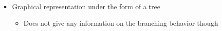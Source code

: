 \documentclass[professionalfont]{beamer}
\newcommand{\couleur}[1]{\textcolor{couleurimportante}{#1}}
\begin{document}
\begin{frame}
\begin{itemize}
	\bigskip

	\item Graphical representation under the form of a \couleur{tree}
	
	\begin{itemize}
		\item Does not give any information on the \couleur{branching behavior} though

% 
	\end{itemize}





\end{itemize}

\end{frame}
\end{document}
